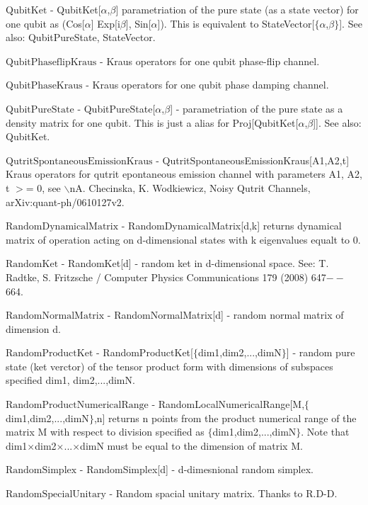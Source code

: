 \documentclass[a4paper,12pt]{article}
\begin{document}
\textbf{$ \text{QubitKet} $ } - QubitKet[$\alpha $,$\beta $] parametriation of the pure state (as a state vector) for one qubit as (Cos[$\alpha $] Exp[i$\beta $], Sin[$\alpha $]). This is equivalent to StateVector[$\{\alpha $,$\beta \}$]. See also: QubitPureState, StateVector.$  $

\textbf{$ \text{QubitPhaseflipKraus} $ } - Kraus operators for one qubit phase-flip channel.$  $

\textbf{$ \text{QubitPhaseKraus} $ } - Kraus operators for one qubit phase damping channel.$  $

\textbf{$ \text{QubitPureState} $ } - QubitPureState[$\alpha $,$\beta $] - parametriation of the pure state as a density matrix for one qubit. This is just a alias for Proj[QubitKet[$\alpha $,$\beta $]]. See also: QubitKet.$  $

\textbf{$ \text{QutritSpontaneousEmissionKraus} $ } - QutritSpontaneousEmissionKraus[A1,A2,t] Kraus operators for qutrit epontaneous emission channel with parameters A1, A2, t $>$= 0, see $\backslash $nA. Checinska, K. Wodkiewicz, Noisy Qutrit Channels, arXiv:quant-ph/0610127v2.$  $

\textbf{$ \text{RandomDynamicalMatrix} $ } - RandomDynamicalMatrix[d,k] returns dynamical matrix of operation acting on d-dimensional states with k eigenvalues equalt to 0.$  $

\textbf{$ \text{RandomKet} $ } - RandomKet[d] - random ket in d-dimensional space. See: T. Radtke, S. Fritzsche / Computer Physics Communications 179 (2008) 647$--$664.$  $

\textbf{$ \text{RandomNormalMatrix} $ } - RandomNormalMatrix[d] - random normal matrix of dimension d.$  $

\textbf{$ \text{RandomProductKet} $ } - RandomProductKet[$\{$dim1,dim2,...,dimN$\}$] - random pure state (ket verctor) of the tensor product form with dimensions of subspaces specified dim1, dim2,...,dimN.$  $

\textbf{$ \text{RandomProductNumericalRange} $ } - RandomLocalNumericalRange[M,$\{$dim1,dim2,...,dimN$\}$,n] returns n points from the product numerical range of the matrix M with respect to division specified as $\{$dim1,dim2,...,dimN$\}$. Note that dim1$\times $dim2$\times $...$\times $dimN must be equal to the dimension of matrix M.$  $

\textbf{$ \text{RandomSimplex} $ } - RandomSimplex[d] - d-dimesnional random simplex.$  $

\textbf{$ \text{RandomSpecialUnitary} $ } - Random spacial unitary matrix. Thanks to R.D-D.$  $
\end{document}

